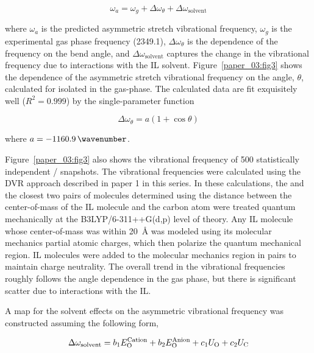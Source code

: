 \begin{equation}
  \label{paper_03:eq:1}
  \omega_{a} = \omega_{g} + \Delta\omega_{\theta} + \Delta\omega_{\text{solvent}}
\end{equation}

where \(\omega_{a}\) is the predicted  asymmetric stretch vibrational frequency, \(\omega_{g}\) is the experimental gas phase frequency (\SI{2349.1}{\wavenumber}), \(\Delta\omega_{\theta}\) is the dependence of the frequency on the  bend angle, and \(\Delta\omega_{\text{solvent}}\) captures the change in the vibrational frequency due to interactions with the IL solvent. Figure~\ref{paper_03:fig3} shows the dependence of the  asymmetric stretch vibrational frequency on the  angle, \(\theta\), calculated for  isolated in the gas-phase. The calculated data are fit exquisitely well (\(R^{2} = 0.999\)) by the single-parameter function

\begin{equation}
  \label{paper_03:eq:2}
  \Delta\omega_{\theta} = a(1 + \cos{\theta})
\end{equation}

where \(a = \SI{-1160.9}{\wavenumber}\).

Figure~\ref{paper_03:fig3} also shows the vibrational frequency of \num{500} statistically independent /\ce{[C4C1im][PF6]} snapshots. The vibrational frequencies were calculated using the DVR approach described in paper 1 in this series. In these calculations, the  and the closest two pairs of \ce{[C4C1im][PF6]} molecules \textemdash{} determined using the distance between the center-of-mass of the IL molecule and the  carbon atom \textemdash{} were treated quantum mechanically at the B3LYP/6-311++G(d,p) level of theory. Any IL molecule whose center-of-mass was within \SI{20}{\angstrom} was modeled using its molecular mechanics partial atomic charges, which then polarize the quantum mechanical region. IL molecules were added to the molecular mechanics region in pairs to maintain charge neutrality. The overall trend in the vibrational frequencies roughly follows the angle dependence in the gas phase, but there is significant scatter due to interactions with the IL.

A map for the solvent effects on the asymmetric  vibrational frequency was constructed assuming the following form,

\begin{equation}
  \label{paper_03:eq:3}
  \Delta\omega_{\text{solvent}} = b_{1}E_{\ce{O}}^{\text{Cation}} + b_{2}E_{\ce{O}}^{\text{Anion}} + c_{1}U_{\ce{O}} + c_{2}U_{\ce{C}}
\end{equation}

